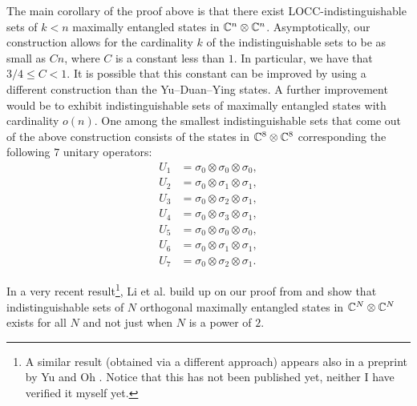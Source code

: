 The main corollary of the proof above is that there exist 
LOCC-indistinguishable sets of $k < n$ maximally entangled states in 
$\mathbb{C}^{n}\otimes\mathbb{C}^{n}$.
Asymptotically, our construction allows for the cardinality $k$ of the indistinguishable 
sets to be as small as $Cn$, where $C$ is a constant less than $1$.
In particular, we have that $3/4 \leq C < 1$. 
It is possible that this constant can be improved by using 
a different construction than the Yu--Duan--Ying states.
A further improvement would be to exhibit 
indistinguishable sets of maximally entangled states with cardinality $o(n)$.
One among the smallest indistinguishable sets that come out of the above construction consists 
of the states in $\mathbb{C}^{8}\otimes\mathbb{C}^{8}$ corresponding the following $7$ unitary operators: 
\begin{equation}
  \label{eq:ydy_Us}
  \begin{aligned}
    U_{1} &= \sigma_{0}\otimes\sigma_{0}\otimes\sigma_{0},\\
    U_{2} &= \sigma_{0}\otimes\sigma_{1}\otimes\sigma_{1},\\
    U_{3} &= \sigma_{0}\otimes\sigma_{2}\otimes\sigma_{1},\\
    U_{4} &= \sigma_{0}\otimes\sigma_{3}\otimes\sigma_{1},\\
    U_{5} &= \sigma_{0}\otimes\sigma_{0}\otimes\sigma_{0},\\
    U_{6} &= \sigma_{0}\otimes\sigma_{1}\otimes\sigma_{1},\\
    U_{7} &= \sigma_{0}\otimes\sigma_{2}\otimes\sigma_{1}.
  \end{aligned}
\end{equation}

\begin{remark}
In a very recent result\footnote{A similar result (obtained via a different approach) appears also 
in a preprint by Yu and Oh \cite{Yu15}. Notice that this has not been
published yet, neither I have verified it myself yet.}, 
Li et al. \cite{Li15} build up on our proof from
\cite{Cosentino14} and show that indistinguishable sets of $N$ orthogonal
maximally entangled states in $\mathbb{C}^{N}\otimes\mathbb{C}^{N}$ exists for all 
$N$ and not just when $N$ is a power of $2$.
\end{remark}

